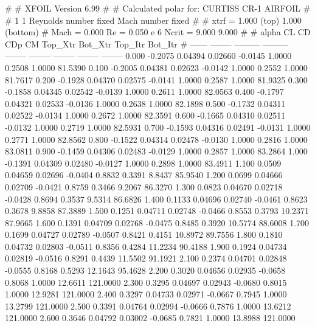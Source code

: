 #  
#       XFOIL         Version 6.99
#  
# Calculated polar for: CURTISS CR-1 AIRFOIL                            
#  
# 1 1 Reynolds number fixed          Mach number fixed         
#  
# xtrf =   1.000 (top)        1.000 (bottom)  
# Mach =   0.000     Re =     0.050 e 6     Ncrit =   9.000  9.000
#  
#   alpha    CL        CD       CDp       CM     Top_Xtr  Bot_Xtr  Top_Itr  Bot_Itr
#  ------ -------- --------- --------- -------- -------- -------- -------- --------
   0.000  -0.2075   0.04394   0.02660  -0.0145   1.0000   0.2508   1.0000  81.5390
   0.100  -0.2005   0.04381   0.02623  -0.0142   1.0000   0.2552   1.0000  81.7617
   0.200  -0.1928   0.04370   0.02575  -0.0141   1.0000   0.2587   1.0000  81.9325
   0.300  -0.1858   0.04345   0.02542  -0.0139   1.0000   0.2611   1.0000  82.0563
   0.400  -0.1797   0.04321   0.02533  -0.0136   1.0000   0.2638   1.0000  82.1898
   0.500  -0.1732   0.04311   0.02522  -0.0134   1.0000   0.2672   1.0000  82.3591
   0.600  -0.1665   0.04310   0.02511  -0.0132   1.0000   0.2719   1.0000  82.5931
   0.700  -0.1593   0.04316   0.02491  -0.0131   1.0000   0.2771   1.0000  82.8562
   0.800  -0.1522   0.04314   0.02478  -0.0130   1.0000   0.2816   1.0000  83.0811
   0.900  -0.1459   0.04306   0.02483  -0.0129   1.0000   0.2857   1.0000  83.2864
   1.000  -0.1391   0.04309   0.02480  -0.0127   1.0000   0.2898   1.0000  83.4911
   1.100   0.0509   0.04659   0.02696  -0.0404   0.8832   0.3391   8.8437  85.9540
   1.200   0.0699   0.04666   0.02709  -0.0421   0.8759   0.3466   9.2067  86.3270
   1.300   0.0823   0.04670   0.02718  -0.0428   0.8694   0.3537   9.5314  86.6826
   1.400   0.1133   0.04696   0.02740  -0.0461   0.8623   0.3678   9.8858  87.3889
   1.500   0.1251   0.04711   0.02748  -0.0466   0.8553   0.3793  10.2371  87.9665
   1.600   0.1391   0.04709   0.02768  -0.0475   0.8485   0.3920  10.5774  88.6008
   1.700   0.1699   0.04727   0.02789  -0.0507   0.8421   0.4151  10.8972  89.7556
   1.800   0.1810   0.04732   0.02803  -0.0511   0.8356   0.4284  11.2234  90.4188
   1.900   0.1924   0.04734   0.02819  -0.0516   0.8291   0.4439  11.5502  91.1921
   2.100   0.2374   0.04701   0.02848  -0.0555   0.8168   0.5293  12.1643  95.4628
   2.200   0.3020   0.04656   0.02935  -0.0658   0.8068   1.0000  12.6611 121.0000
   2.300   0.3295   0.04697   0.02943  -0.0680   0.8015   1.0000  12.9281 121.0000
   2.400   0.3297   0.04733   0.02971  -0.0667   0.7945   1.0000  13.2799 121.0000
   2.500   0.3391   0.04764   0.02994  -0.0666   0.7876   1.0000  13.6212 121.0000
   2.600   0.3646   0.04792   0.03002  -0.0685   0.7821   1.0000  13.8988 121.0000
